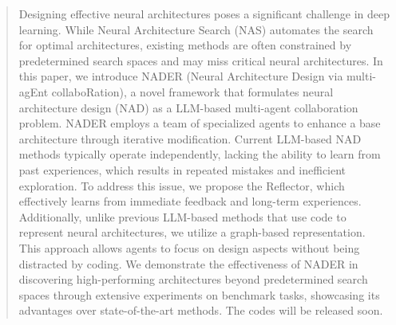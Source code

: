 \begin{abstract}
Designing effective neural architectures poses a significant challenge in deep learning. While Neural Architecture Search (NAS) automates the search for optimal architectures, existing methods are often constrained by predetermined search spaces and may miss critical neural architectures. In this paper, we introduce NADER (Neural Architecture Design via multi-agEnt collaboRation), a novel framework that formulates neural architecture design (NAD) as a LLM-based multi-agent collaboration problem.
NADER employs a team of specialized agents to enhance a base architecture through iterative modification.
Current LLM-based NAD methods typically operate independently, lacking the ability to learn from past experiences, which results in repeated mistakes and inefficient exploration. To address this issue, we propose the Reflector, which effectively learns from immediate feedback and long-term experiences. Additionally, unlike previous LLM-based methods that use code to represent neural architectures, we utilize a graph-based representation. This approach allows agents to focus on design aspects without being distracted by coding.
We demonstrate the effectiveness of NADER in discovering high-performing architectures beyond predetermined search spaces through extensive experiments on benchmark tasks, showcasing its advantages over state-of-the-art methods. The codes will be released soon.
\end{abstract}

